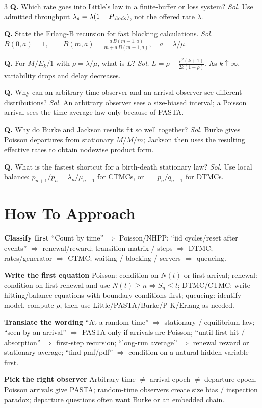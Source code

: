\documentclass[a4paper,8pt,fleqn]{extarticle}
\newcommand{\1}{\mathbf{1}}
\newcommand{\sub}[1]{\textbf{#1} }
\newcommand{\probq}[2]{\textbf{Q.} #1 \emph{Sol.} #2\par}
\begin{document}
\begin{multicols}{3}
\probq{Which rate goes into Little's law in a finite-buffer or loss system?}{Use admitted throughput \(\lambda_s=\lambda(1-P_{\rm block})\), not the offered rate \(\lambda\).}
\probq{State the Erlang-B recursion for fast blocking calculations.}{\(\displaystyle B(0,a)=1,\qquad B(m,a)=\frac{a\,B(m-1,a)}{m+a\,B(m-1,a)},\quad a=\lambda/\mu.\)}
\probq{For \(M/E_k/1\) with \(\rho=\lambda/\mu\), what is \(L\)?}{\(\displaystyle L=\rho+\frac{\rho^2(k+1)}{2k(1-\rho)}\). As \(k\uparrow\infty\), variability drops and delay decreases.}
\probq{Why can an arbitrary-time observer and an arrival observer see different distributions?}{An arbitrary observer sees a size-biased interval; a Poisson arrival sees the time-average law only because of PASTA.}
\probq{Why do Burke and Jackson results fit so well together?}{Burke gives Poisson departures from stationary \(M/M/m\); Jackson then uses the resulting effective rates to obtain nodewise product form.}
\probq{What is the fastest shortcut for a birth-death stationary law?}{Use local balance: \(p_{n+1}/p_n=\lambda_n/\mu_{n+1}\) for CTMCs, or \(=\ p_n/q_{n+1}\) for DTMCs.}

\section*{How To Approach}
\sub{Classify first} ``Count by time'' \(\Rightarrow\) Poisson/NHPP; ``iid cycles/reset after events'' \(\Rightarrow\) renewal/reward; transition matrix / steps \(\Rightarrow\) DTMC; rates/generator \(\Rightarrow\) CTMC; waiting / blocking / servers \(\Rightarrow\) queueing.

\sub{Write the first equation} Poisson: condition on \(N(t)\) or first arrival; renewal: condition on first renewal and use \(N(t)\ge n\iff S_n\le t\); DTMC/CTMC: write hitting/balance equations with boundary conditions first; queueing: identify model, compute \(\rho\), then use Little/PASTA/Burke/P-K/Erlang as needed.

\sub{Translate the wording} ``At a random time'' \(\Rightarrow\) stationary / equilibrium law; ``seen by an arrival'' \(\Rightarrow\) PASTA only if arrivals are Poisson; ``until first hit / absorption'' \(\Rightarrow\) first-step recursion; ``long-run average'' \(\Rightarrow\) renewal reward or stationary average; ``find pmf/pdf'' \(\Rightarrow\) condition on a natural hidden variable first.

\sub{Pick the right observer} Arbitrary time \(\neq\) arrival epoch \(\neq\) departure epoch. Poisson arrivals give PASTA; random-time observers create size bias / inspection paradox; departure questions often want Burke or an embedded chain.


\end{multicols}
\end{document}
